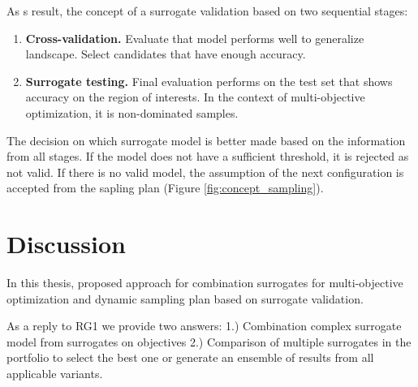         As s result, the concept of a surrogate validation based on two sequential stages:
        \begin{enumerate}
            \item \textbf{Cross-validation.} Evaluate that model performs well to generalize landscape. Select candidates that have enough accuracy.
            \item \textbf{Surrogate testing.} Final evaluation performs on the test set that shows accuracy on the region of interests. In the context of multi-objective optimization, it is non-dominated samples.
        \end{enumerate}
        
        The decision on which surrogate model is better made based on the information from all stages. If the model does not have a sufficient threshold, it is rejected as not valid. If there is no valid model, the assumption of the next configuration is accepted from the sapling plan (Figure \ref{fig:concept_sampling}).

    




    \section{Discussion}

        In this thesis, proposed approach for combination surrogates for multi-objective optimization and dynamic sampling plan based on surrogate validation.

        As a reply to RG1 we provide two answers: 1.) Combination complex surrogate model from surrogates on objectives 2.) Comparison of multiple surrogates in the portfolio to select the best one or generate an ensemble of results from all applicable variants.

